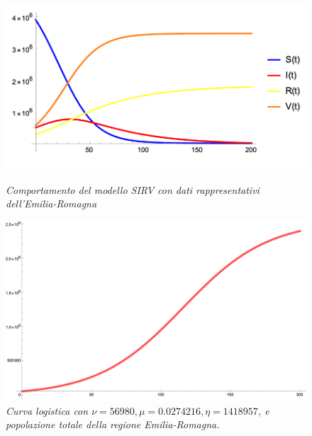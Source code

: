 \documentclass{article}
\begin{document}
\begin{figure}[h!]
\centering
\begin{minipage}[t]{.4\paperwidth}
    \hspace{-10pt}
    \includegraphics[width=\textwidth]{SIRV.png}
    \caption{\textit{Comportamento del modello SIRV con dati 
    rappresentativi dell'Emilia-Romagna}}
    \label{fig::SIRV}
    \end{minipage}%
\hfill %
\begin{minipage}[t]{.4\paperwidth}
    \hspace{-10pt}
    \includegraphics[width=\textwidth]{vaccinati.png}
    \caption{\textit{Curva logistica con $\nu=56980, 
    \mu=0.0274216, \eta=1418957$, e popolazione totale della 
    regione Emilia-Romagna.}}
    \label{fig::vaccinati}
\end{minipage}
\end{figure}
\end{document}
